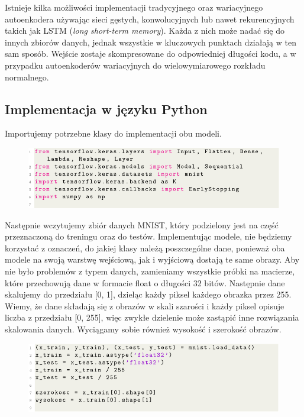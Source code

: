 \documentclass[a4paper,12pt,oneside]{book} %
\begin{document}
Istnieje kilka możliwości implementacji tradycyjnego oraz wariacyjnego autoenkodera używając sieci gęstych, konwolucyjnych lub nawet rekurencyjnych takich jak LSTM (\textit{long short-term memory}). Każda z nich może nadać się do innych zbiorów danych, jednak wszystkie w kluczowych punktach działają w ten sam sposób. Wejście zostaje skompresowane do odpowiedniej długości kodu, a w przypadku autoenkoderów wariacyjnych do wielowymiarowego rozkładu normalnego. 
\subsection{Implementacja w języku Python}
Importujemy potrzebne klasy do implementacji obu modeli.
\begin{figure}[h!]
	\centering
	\includegraphics[width=\linewidth]{importy.pdf}
\end{figure}

Następnie wczytujemy zbiór danych MNIST, który podzielony jest na część przeznaczoną do treningu oraz do testów. Implementując modele, nie będziemy korzystać z oznaczeń, do jakiej klasy należą poszczególne dane, ponieważ oba modele na swoją warstwę wejściową, jak i wyjściową dostają te same obrazy. Aby nie było problemów z typem danych, zamieniamy wszystkie próbki na macierze, które przechowują dane w formacie float o długości 32 bitów. Następnie dane skalujemy do przedziału [0, 1], dzieląc każdy piksel każdego obrazka przez 255. Wiemy, że dane składają się z obrazów w skali szarości i każdy piksel opisuje liczba z przedziału [0, 255], więc zwykłe dzielenie może zastąpić inne rozwiązania skalowania danych. Wyciągamy sobie również wysokość i szerokość obrazów.
\begin{figure}[h!]
	\centering
	\includegraphics[width=\linewidth]{dane.pdf}
\end{figure}
\end{document}
